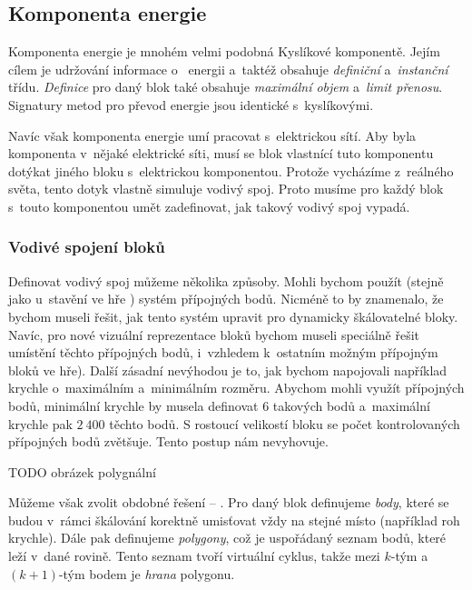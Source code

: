 \subsection{Komponenta energie}

Komponenta energie je mnohém velmi podobná Kyslíkové komponentě. Jejím cílem je udržování informace o~ energii a~taktéž obsahuje \textit{definiční} a~\textit{instanční} třídu. \textit{Definice} pro daný blok také obsahuje \textit{maximální objem} a~\textit{limit přenosu}. Signatury metod pro převod energie jsou identické s~kyslíkovými.

Navíc však komponenta energie umí pracovat s~elektrickou sítí. Aby byla komponenta v~nějaké elektrické síti, musí se blok vlastnící tuto komponentu dotýkat jiného bloku s~elektrickou komponentou. Protože vycházíme z~reálného světa, tento dotyk vlastně simuluje vodivý spoj. Proto musíme pro každý blok s~touto komponentou umět zadefinovat, jak takový vodivý spoj vypadá.

\subsubsection{Vodivé spojení bloků}

Definovat vodivý spoj můžeme několika způsoby. Mohli bychom použít (stejně jako u~stavění ve hře \TM{}) systém přípojných bodů. Nicméně to by znamenalo, že bychom museli řešit, jak tento systém upravit pro dynamicky škálovatelné bloky. Navíc, pro nové vizuální reprezentace bloků bychom museli speciálně řešit umístění těchto přípojných bodů, i~vzhledem k~ostatním možným přípojným bloků ve hře). Další zásadní nevýhodou je to, jak bychom napojovali například krychle o~maximálním a~minimálním rozměru. Abychom mohli využít přípojných bodů, minimální krychle by musela definovat $6$ takových bodů a~maximální krychle pak $2~400$ těchto bodů. S rostoucí velikostí bloku se počet kontrolovaných přípojných bodů zvětšuje.  Tento postup nám nevyhovuje.

TODO obrázek polygnální 

Můžeme však zvolit obdobné řešení -- . Pro daný blok definujeme \textit{body}, které se budou v~rámci škálování korektně umisťovat vždy na stejné místo (například roh krychle). Dále pak definujeme \textit{polygony}, což je uspořádaný seznam bodů, které leží v~dané rovině. Tento seznam tvoří virtuální cyklus, takže mezi $k$-tým a~$(k+1)$-tým bodem je \textit{hrana} polygonu.

